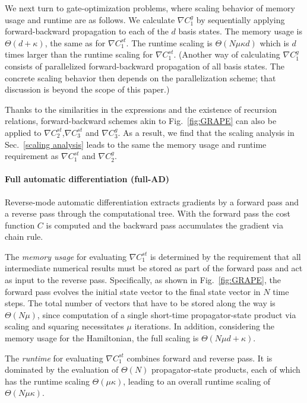 \documentclass[12pt]{article}
\begin{document}
We next turn to gate-optimization problems, where scaling behavior of memory usage and runtime are as follows. We calculate $\nabla C_1^{ g}$ by sequentially 
applying forward-backward propagation to each of the $d$ basis states. The memory usage is $\Theta(d+\kappa)$, the same as for $\nabla C_1^{st}$. The runtime scaling is $\Theta(N\mu\kappa d)$ which is $d$ times larger than the runtime scaling for $\nabla C_1^{st}$. (Another way of calculating $\nabla C_1^{ g}$ consists of parallelized forward-backward propagation of all basis states. The concrete scaling behavior then depends on the parallelization scheme; that discussion is beyond the scope of this paper.)

Thanks to the similarities in the expressions and the existence of recursion relations, forward-backward schemes akin to Fig.\ \ref{fig:GRAPE} 
can also be applied to $\nabla C_2^{st}$,$\nabla C_3^{st}$ and $\nabla C_3^{g}$. As a result, we find that the scaling analysis in Sec.\ \ref{scaling analysis} leads to the same the memory usage and runtime requirement as $\nabla C_1^{st}$ and $\nabla C_2^{g}$.



\paragraph{Full automatic differentiation (full-AD)}
Reverse-mode automatic differentiation extracts gradients by a forward pass and a reverse pass through the computational tree. With the forward pass the cost function $C$ is computed and the backward pass accumulates the gradient via chain rule.

The \textit{memory usage} for evaluating $\nabla C_1^{st}$ is determined by the requirement that all intermediate numerical results must be stored as part of the forward pass and act as input to the reverse pass. Specifically, as shown in Fig.\ \ref{fig:GRAPE}, the forward pass evolves the initial state vector to the final state vector in $N$ time steps. The total number of vectors that have to be stored along the way is $\Theta
(N\mu)$, since computation of a single short-time propagator-state product via scaling and squaring necessitates $\mu$ iterations. In addition, considering the memory usage for the Hamiltonian, the full scaling is $\Theta(N\mu d +\kappa)$. 

The \textit{runtime} for evaluating $\nabla C_1^{st}$ combines forward and reverse pass. It is dominated by the evaluation of $\Theta(N)$ propagator-state products, each of which has the runtime scaling $\Theta(\mu\kappa)$, leading to an overall runtime scaling of $\Theta(N\mu \kappa )$.
\end{document}
